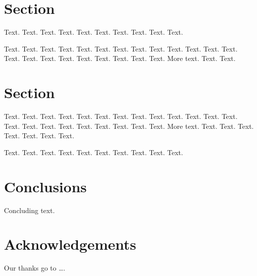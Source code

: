 \documentclass[11pt,a4paper]{article}
\begin{document}
\section{Section}

Text. Text. Text. Text. Text.
Text. Text. Text. Text. Text.

Text. Text. Text. Text. Text.
Text. Text. Text. Text. Text.
Text. Text. Text. Text. Text.
Text. Text. Text. Text. Text.
Text. Text. More text. Text. Text.

\section{Section}

Text. Text. Text. Text. Text.
Text. Text. Text. Text. Text.
Text. Text. Text. Text. Text.
Text. Text. Text. Text. Text.
Text. Text. More text. Text. Text.
Text. Text. Text. Text. Text.

Text. Text. Text. Text. Text.
Text. Text. Text. Text. Text.

\section{Conclusions}

Concluding text.

\section{Acknowledgements}

Our thanks go to \ldots .
\end{document}

